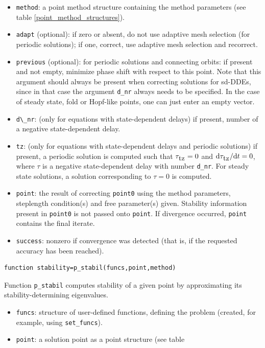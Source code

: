 \documentclass[10pt]{scrartcl}
\renewcommand{\d}{\mathrm{d}}
\newcommand{\blist}[1]{\mbox{\lstinline!#1!}}
\begin{document}
{\begin{itemize}
  is zero. Similar formulas hold for the other solution types.
\item \blist{method}: a point method structure containing the method
  parameters (see table \ref{point_method_structures}).
\item \blist{adapt} (optional): if zero or absent, do not use adaptive
  mesh selection (for periodic solutions); if one, correct, use
  adaptive mesh selection and recorrect.
\item \blist{previous} (optional): for periodic solutions and
  connecting orbits: if present and not empty, minimize phase shift
  with respect to this point. Note that this argument should always be
  present when correcting solutions for sd-DDEs, since in that case
  the argument \blist{d_nr} always needs to be specified.  In the case
  of steady state, fold or Hopf-like points, one can just enter an
  empty vector.
\item \blist{d\_nr}: (only for equations with state-dependent delays)
  if present, number of a negative state-dependent delay.
\item \blist{tz}: (only for equations with state-dependent delays and
  periodic solutions) if present, a periodic solution is computed such
  that $\tau_{\blist{tz}}=0$ and ${\d}\tau_{\blist{tz}}/{\d}t=0$, where
  $\tau$ is a negative state-dependent delay with number
  \blist{d_nr}. For steady state solutions, a solution corresponding
  to $\tau=0$ is computed.
\item \blist{point}: the result of correcting \blist{point0} using the
  method parameters, steplength condition(s) and free parameter(s)
  given. Stability information present in \blist{point0} is not passed
  onto \blist{point}.  If divergence occurred, \blist{point} contains
  the final iterate.
\item \blist{success}: nonzero if convergence was detected (that is,
  if the requested accuracy has been reached).
\end{itemize}
\begin{lstlisting}
function stability=p_stabil(funcs,point,method)  
\end{lstlisting}
\noindent Function \blist{p_stabil} computes stability of a given
point by approximating its stability-determining eigenvalues.
\begin{itemize}
\item \blist{funcs}: structure of user-defined functions, defining the
  problem (created, for example, using \blist{set_funcs}).
\item \blist{point}: a solution point as a point structure (see table

\end{itemize}}
\end{document}
